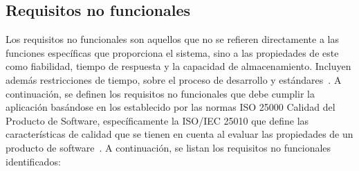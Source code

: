 \subsection{Requisitos no funcionales}

Los requisitos no funcionales son aquellos que no se refieren directamente a las funciones
específicas que proporciona el sistema, sino a las propiedades de este como fiabilidad,
tiempo de respuesta y la capacidad de almacenamiento. Incluyen además restricciones de
tiempo, sobre el proceso de desarrollo y estándares~\cite{sommerville2011software}.
A continuación, se definen los requisitos no funcionales que debe cumplir la aplicación
basándose en los establecido por las normas ISO 25000 Calidad del Producto de Software,
específicamente la ISO/IEC 25010 que define las características de calidad que se tienen
en cuenta al evaluar las propiedades de un producto de software~\cite{ISO25010-2023}.
A continuación, se listan los requisitos no funcionales identificados:

